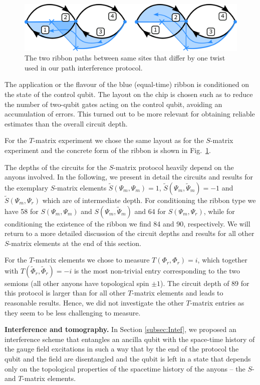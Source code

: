 \documentclass[a4paper,twocolumn,11pt, accepted=2024-06-14]{quantumarticle}
\begin{document}
\begin{figure}
	\centering
	\includegraphics[width=\linewidth]{Figures/t-mat_ribs.pdf}
	\caption{The two ribbon paths between same sites that differ by one twist used in our path interference protocol.}
	\label{fig:T_intef_setup}
\end{figure}
The application or the flavour of the blue (equal-time) ribbon is conditioned on the state of the control qubit.
The layout on the chip is chosen such as to reduce the number of two-qubit gates acting on the control qubit, avoiding an accumulation of errors. This turned out to be more relevant for obtaining reliable estimates than the overall circuit depth. 

For the $T$-matrix experiment we chose the same layout as for the $S$-matrix experiment and the concrete form of the ribbon is shown in Fig.~\ref{fig:T_intef_setup}.

The depths of the circuits for the $S$-matrix protocol heavily depend on the anyons involved.
In the following, we present in detail the circuits and results for the exemplary $S$-matrix elements $\tilde{S}(\Psi_m, \Psi_m)=1$, $\tilde{S}(\Psi_m, \tilde{\Psi}_m)=-1$ and $\tilde{S}(\Psi_m, \Psi_r)$ which are of intermediate depth. For conditioning the ribbon type we have 58 for $S(\Psi_m, \Psi_m)$ and $S(\Psi_m, \tilde{\Psi}_m)$	 and 64  for $S(\Psi_m, \Psi_r)$, while for conditioning the existence of the ribbon we find 84 and 90, respectively. We will return to a more detailed discussion of the circuit depths and results for all other $S$-matrix elements at the end of this section.

For the $T$-matrix elements we chose to measure $T(\Phi_r,\Phi_r)=i$, which together with $T(\tilde{\Phi}_r,\tilde{\Phi}_r)=-i$ is the most non-trivial entry corresponding to the two semions (all other anyons have topological spin $\pm 1$). The circuit depth of 89 for this protocol is larger than for all other $T$-matrix elements and leads to reasonable results. Hence, we did not investigate the other $T$-matrix entries as they seem to be less challenging to measure.

\textbf{Interference and tomography.}
In Section \ref{subsec:Intef}, we proposed an interference scheme that entangles an ancilla qubit with the space-time history of the gauge field excitations in such a way that by the end of the protocol the qubit and the field are disentangled and the qubit is left in a state that depends only on the topological properties of the spacetime history of the anyons -- the $S$- and $T$-matrix elements.
\end{document}
